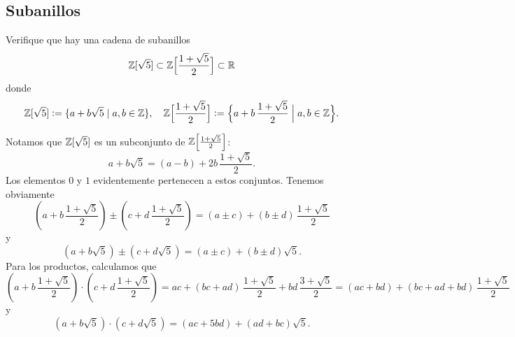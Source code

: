 \subsection*{Subanillos}

\begin{ejercicio}
  Verifique que hay una cadena de subanillos
  $$\mathbb{Z} [\sqrt{5}] \subset \mathbb{Z} \Bigl[\frac{1 + \sqrt{5}}{2}\Bigr] \subset \mathbb{R}$$
  donde
  \[ \mathbb{Z} [\sqrt{5}] \mathrel{\mathop:}= \{ a + b\sqrt{5} \mid a,b\in \mathbb{Z} \}, \quad
     \mathbb{Z} \Bigl[\frac{1 + \sqrt{5}}{2}\Bigr] \mathrel{\mathop:}=
     \Bigl\{ a + b\,\frac{1 + \sqrt{5}}{2} \Bigm| a,b\in \mathbb{Z} \Bigr\}. \]

  \ifdefined\solutions
  \begin{solucion}
    Notamos que $\mathbb{Z} [\sqrt{5}]$ es un subconjunto de
    $\mathbb{Z} \Bigl[\frac{1 + \sqrt{5}}{2}\Bigr]$:
    $$a + b\sqrt{5} = (a - b) + 2b\,\frac{1 + \sqrt{5}}{2}.$$
    Los elementos $0$ y $1$ evidentemente pertenecen a estos conjuntos. Tenemos
    obviamente
    \[ \left(a + b\,\frac{1 + \sqrt{5}}{2}\right) \pm
       \left(c + d\,\frac{1 + \sqrt{5}}{2}\right) =
       (a\pm c) + (b\pm d)\,\frac{1 + \sqrt{5}}{2} \]
    y
    \[ \left(a + b\sqrt{5}\right) \pm \left(c + d\sqrt{5}\right) =
       (a\pm c) + (b\pm d)\sqrt{5}. \]
    Para los productos, calculamos que
    \[ \left(a + b\,\frac{1 + \sqrt{5}}{2}\right) \cdot
       \left(c + d\,\frac{1 + \sqrt{5}}{2}\right) =
       ac + (bc + ad)\,\frac{1 + \sqrt{5}}{2} + bd\,\frac{3 + \sqrt{5}}{2} =
       (ac + bd) + (bc + ad + bd)\,\frac{1 + \sqrt{5}}{2} \]
    y
    \[ \left(a + b\sqrt{5}\right)\cdot \left(c + d\sqrt{5}\right) =
       (ac + 5bd) + (ad + bc)\sqrt{5}. \]
  \end{solucion}
  \fi
\end{ejercicio}

